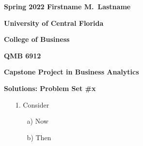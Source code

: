 \documentclass[11pt]{book}
\begin{document}
\pagestyle{empty}
{\noindent\bf Spring 2022 \hfill Firstname M.~Lastname}
\vskip 16pt
\centerline{\bf University of Central Florida}
\centerline{\bf College of Business}
\vskip 16pt
\centerline{\bf QMB 6912}
\centerline{\bf Capstone Project in Business Analytics}
\vskip 10pt
\centerline{\bf Solutions:  Problem Set \#x}
\vskip 32pt
\noindent
\begin{itemize}
\item[1.] Consider 

\begin{itemize}
\item[a)] Now

\item[b)] Then
\end{itemize}
\end{itemize}
\end{document}
